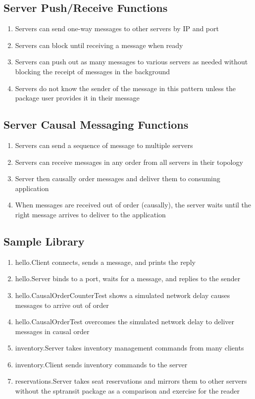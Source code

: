\documentclass[10pt,journal,compsoc]{IEEEtran}
\begin{document}
\subsection{Server Push/Receive Functions}
\begin{enumerate}
    \item Servers can send one-way messages to other servers by IP and port
    \item Servers can block until receiving a message when ready
    \item Servers can push out as many messages to various servers as needed without blocking the receipt of messages in the background
    \item Servers do not know the sender of the message in this pattern unless the package user provides it in their message
\end{enumerate}

\subsection{Server Causal Messaging Functions}
\begin{enumerate}
    \item Servers can send a sequence of message to multiple servers
    \item Servers can receive messages in any order from all servers 
    in their topology
    \item Server then causally order messages and deliver them to 
    consuming application
    \item When messages are received out of order (causally), the server
    waits until the right message arrives to deliver to the application
\end{enumerate}

\subsection{Sample Library}
\begin{enumerate}
    \item hello.Client connects, sends a message, and prints the reply
    \item hello.Server binds to a port, waits for a message, and replies to the sender
    \item hello.CausalOrderCounterTest shows a simulated network delay causes messages to arrive out of order
    \item hello.CausalOrderTest overcomes the simulated network delay to deliver messages in causal order
    \item inventory.Server takes inventory management commands from many clients
    \item inventory.Client sends inventory commands to the server
    \item reservations.Server takes seat reservations and mirrors them to other servers without the sptransit package as a comparison and exercise for the reader
\end{enumerate}
\end{document}
